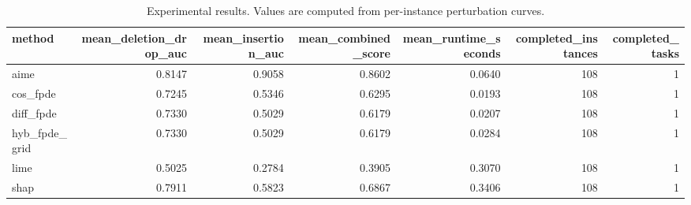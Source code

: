 \begin{table}[t]
\caption{Experimental results. Values are computed from per-instance perturbation curves.}
\label{tab:main_results_computed}
\centering
\begin{tabular}{lrrrrrr}
\toprule
method & mean\_deletion\_drop\_auc & mean\_insertion\_auc & mean\_combined\_score & mean\_runtime\_seconds & completed\_instances & completed\_tasks \\
\midrule
aime & 0.8147 & 0.9058 & 0.8602 & 0.0640 & 108 & 1 \\
cos\_fpde & 0.7245 & 0.5346 & 0.6295 & 0.0193 & 108 & 1 \\
diff\_fpde & 0.7330 & 0.5029 & 0.6179 & 0.0207 & 108 & 1 \\
hyb\_fpde\_grid & 0.7330 & 0.5029 & 0.6179 & 0.0284 & 108 & 1 \\
lime & 0.5025 & 0.2784 & 0.3905 & 0.3070 & 108 & 1 \\
shap & 0.7911 & 0.5823 & 0.6867 & 0.3406 & 108 & 1 \\
\bottomrule
\end{tabular}

\end{table}
